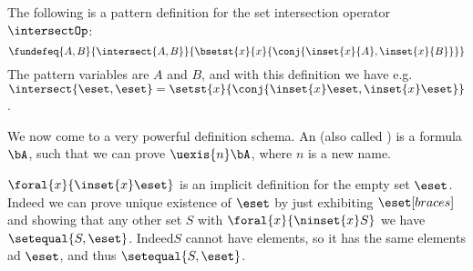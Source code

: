 \documentclass[notes,mh]{mikoslides}
\begin{document}
\begin{module}[id=mathtalk-definitions]
\begin{note}
\begin{example}[id=patterndef.fex,for=pattern.def]
  The following is a pattern definition for the set intersection operator $\intersectOp$:
  \[\fundefeq{A,B}{\intersect{A,B}}{\bsetst{x}{x}{\conj{\inset{x}{A},\inset{x}{B}}}}\]
  The pattern variables are $A$ and $B$, and with this definition we have e.g.
  $\intersect{\eset,\eset}=\setst{x}{\conj{\inset{x}\eset,\inset{x}\eset}}$.
\end{example}

\begin{definition}[id=implicitdef.def]
  We now come to a very powerful definition schema. An 
  (also called ) is a
  formula $\bA$, such that we can prove $\uexis{n}\bA$, where $n$ is a new name.
\end{definition}

\begin{example}[id=implicitdef.ex,for=implicitdef.def]
  $\foral{x}{\inset{x}\eset}$ is an implicit definition for the empty set $\eset$. Indeed
  we can prove unique existence of $\eset$ by just exhibiting $\eset[braces]$ and showing
  that any other set $S$ with $\foral{x}{\ninset{x}S}$ we have
  $\setequal{S,\eset}$. Indeed$S$ cannot have elements, so it has the same elements ad
  $\eset$, and thus $\setequal{S,\eset}$.
\end{example}
\end{note}
\end{module}
\end{document}
